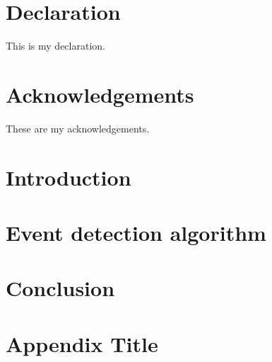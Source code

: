 \documentclass[12pt,twoside]{report}
\begin{document}






\chapter*{Declaration}
This is my declaration.


\chapter*{Acknowledgements}
These are my acknowledgements.


\tableofcontents
\listoffigures


\chapter*{Introduction}


\chapter{Event detection algorithm}


\chapter*{Conclusion}



\appendix
\chapter{Appendix Title}



\printbibliography
\end{document}
